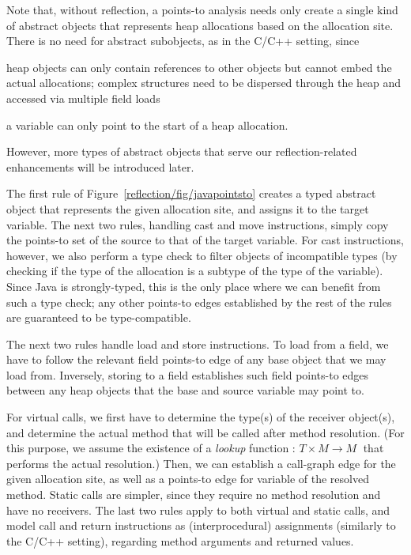 Note that, without reflection, a points-to analysis needs only create
a single kind of abstract objects that represents heap allocations
based on the allocation site. There is no need for abstract
subobjects, as in the C/C++ setting, since
\begin{inparaenum}[(i)]
\item heap objects can only contain references to other objects but
  cannot embed the actual allocations; complex structures need to be
  dispersed through the heap and accessed via multiple field loads
\item a variable can only point to the start of a heap allocation.
\end{inparaenum}
However, more types of abstract objects that serve our
reflection-related enhancements will be introduced later.

The first rule of Figure~\ref{reflection/fig/javapointsto} creates a
typed abstract object that represents the given allocation site, and
assigns it to the target variable. The next two rules, handling cast
and move instructions, simply copy the points-to set of the source to
that of the target variable. For cast instructions, however, we also
perform a type check to filter objects of incompatible types (by
checking if the type of the allocation is a subtype of the type of the
variable). Since Java is strongly-typed, this is the only place
where we can benefit from such a type check; any other points-to edges
established by the rest of the rules are guaranteed to be
type-compatible.

The next two rules handle load and store instructions. To load from a
field, we have to follow the relevant field points-to edge of any base
object that we may load from. Inversely, storing to a field
establishes such field points-to edges between any heap objects that
the base and source variable may point to.

For virtual calls, we first have to determine the type(s) of the
receiver object(s), and determine the actual method that will be
called after method resolution. (For this purpose, we assume the
existence of a \emph{lookup} function
\(:\, T \times M \rightarrow M \;\) that performs the actual
resolution.) Then, we can establish a call-graph edge for the given
allocation site, as well as a points-to edge for variable 
of the resolved method. Static calls are simpler, since they require
no method resolution and have no receivers. The last two rules apply
to both virtual and static calls, and model call and return
instructions as (interprocedural) assignments (similarly to the C/C++
setting), regarding method arguments and returned values.


